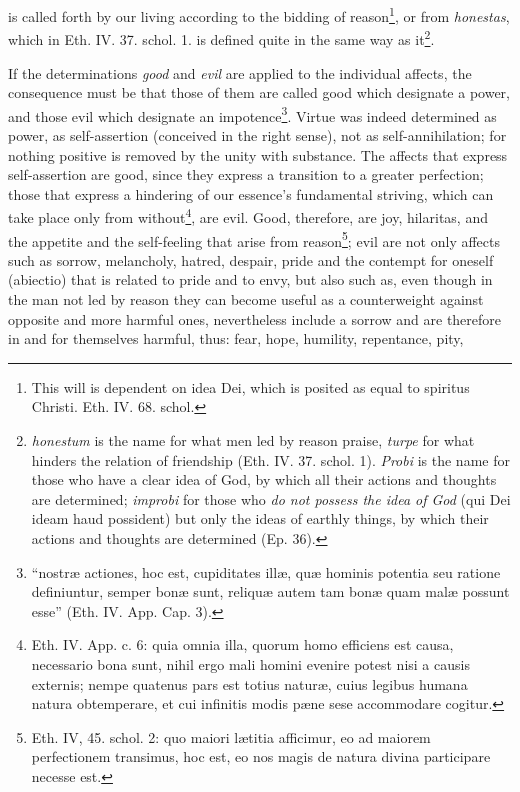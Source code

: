 \documentclass[12pt,a4paper,openany]{book}
\newcommand{\opage}[1]{\marginnote{\footnotesize\textit{[#1]}}}
\begin{document}
is called forth by our living according to the bidding of reason\footnote{This will is dependent on idea Dei, which is posited as equal to spiritus
Christi. Eth. IV. 68. schol.},
or from \emph{honestas}, which in Eth. IV. 37. schol. 1. is defined
quite in the same way as it\footnote{\emph{honestum} is the name for what men led by reason
praise, \emph{turpe} for what hinders the relation of friendship (Eth. IV. 37.
schol. 1). \emph{Probi} is the name for those who have a clear idea of God, by
which all their actions and thoughts are determined; \emph{improbi} for those
who \emph{do not possess the idea of God} (qui Dei ideam haud possident)
but only the ideas of earthly things, by which their actions
and thoughts are determined (Ep. 36).}.

If the determinations \emph{good} and \emph{evil} are applied to the
individual affects, the consequence must be that those of them
are called good which designate a power, and those evil which
designate an impotence\footnote{``nostræ actiones, hoc est, cupiditates illæ, quæ hominis potentia
seu ratione definiuntur, semper bonæ sunt, reliquæ autem tam bonæ
quam malæ possunt esse'' (Eth. IV. App. Cap. 3).}. Virtue was indeed determined as power, as
self-assertion (conceived in the right sense), not as self-annihilation;
for nothing positive is removed by the unity with
substance. The affects that express self-assertion are
good, since they express a transition to a greater perfection;
those that express a hindering of our essence's
\opage{129}\setcounter{footnote}{0}fundamental striving, which can take place only from without\footnote{Eth. IV. App. c. 6: quia omnia illa, quorum homo efficiens est
causa, necessario bona sunt, nihil ergo mali homini evenire potest
nisi a causis externis; nempe quatenus pars est totius naturæ,
cuius legibus humana natura obtemperare, et cui infinitis modis
pæne sese accommodare cogitur.}, are evil.
Good, therefore, are joy, hilaritas, and the appetite and the
self-feeling that arise from reason\footnote{Eth. IV, 45. schol. 2: quo maiori lætitia afficimur, eo ad maiorem
perfectionem transimus, hoc est, eo nos magis de natura divina
participare necesse est.}; evil are not only
affects such as sorrow, melancholy, hatred, despair, pride
and the contempt for oneself (abiectio) that is related to pride and to envy,
but also such as, even though in the man not led
by reason they can become useful as a counterweight against opposite and more harmful ones,
nevertheless include a sorrow and are therefore in and for themselves harmful,
thus: fear, hope, humility, repentance, pity,
\end{document}
